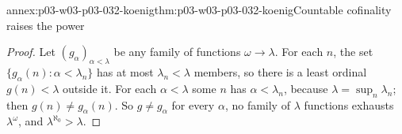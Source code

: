 \begin{annexitem}{annex:p03-w03-p03-032-koenig}{thm:p03-w03-p03-032-koenig}{Countable cofinality raises the power}
\begin{proof}
Let \((g_\alpha)_{\alpha<\lambda}\) be any family of functions
\(\omega\to\lambda\).  For each \(n\), the set
\(\{g_\alpha(n):\alpha<\lambda_n\}\) has at most \(\lambda_n<\lambda\)
members, so there is a least ordinal \(g(n)<\lambda\) outside it.  For each
\(\alpha<\lambda\) some \(n\) has \(\alpha<\lambda_n\), because
\(\lambda=\sup_n\lambda_n\); then \(g(n)\neq g_\alpha(n)\).  So
\(g\neq g_\alpha\) for every \(\alpha\), no family of \(\lambda\) functions
exhausts \(\lambda^\omega\), and \(\lambda^{\aleph_0}>\lambda\).
\end{proof}
\end{annexitem}

